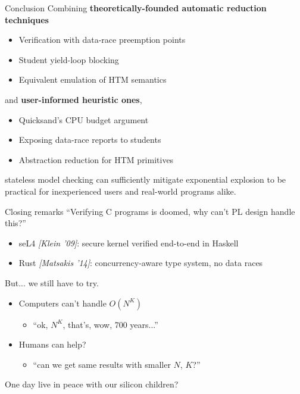 \documentclass[xcolor=dvipsnames]{beamer}
\newcommand\hilight[2]{\color{#1}#2\color{black}}
\begin{document}
\begin{frame}{Conclusion}
	Combining %
	{\bf theoretically-founded automatic reduction techniques}
	\begin{itemize}
		\item \hilight{sect-quicksand}{Verification with data-race preemption points}
		\item \hilight{sect-410}{Student yield-loop blocking} %
		\item \hilight{sect-htm}{Equivalent emulation of HTM semantics}
	\end{itemize}
	and {\bf user-informed heuristic ones},
	\begin{itemize}
		\item \hilight{sect-quicksand}{Quicksand's CPU budget argument}
		\item \hilight{sect-410}{Exposing data-race reports to students}
		\item \hilight{sect-htm}{Abstraction reduction for HTM primitives}
	\end{itemize}
	\linegap

	\hilight{gray}{stateless model checking}\xspace
	\hilight{sect-pastel-quicksand}{can sufficiently mitigate exponential explosion}\xspace
	\hilight{sect-pastel-410}{to be practical for inexperienced users}\xspace
	\hilight{sect-pastel-htm}{and real-world programs alike.}\xspace
\end{frame}
\begin{frame}{Closing remarks}
	``Verifying C programs is doomed, why can't PL design handle this?''
	\begin{itemize}
		\item seL4 {\em [Klein '09]}: secure kernel verified end-to-end in Haskell
		\item Rust {\em [Matsakis '14]}: concurrency-aware type system, no data races
	\end{itemize}
	\pause
	\linegap

	But... we still have to try.
	\begin{itemize}
		\item Computers can't handle $O(N^K)$
			\begin{itemize}
				\item ``ok, $N^K$, that's, wow, 700 years...''
			\end{itemize}
		\item Humans can help?
			\begin{itemize}
				\item ``can we get same results with smaller $N$, $K$?''
			\end{itemize}
	\end{itemize}
	\pause
	\linegap

	One day live in peace with our silicon children?
\end{frame}
\end{document}
